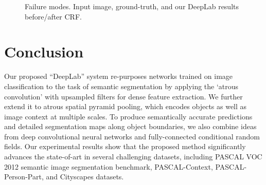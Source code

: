 \documentclass[10pt,journal,compsoc]{IEEEtran}
\begin{document}
\begin{figure}[!t]
\centering
{}
  \caption{Failure modes. Input image, ground-truth, and our DeepLab results before/after CRF.}  
  \label{fig:failure_modes}
\end{figure}
 \section{Conclusion}
Our proposed ``DeepLab'' system re-purposes networks trained
on image classification to the task of semantic segmentation by applying the `atrous convolution' with upsampled filters for dense feature extraction. We further extend it to atrous spatial pyramid pooling, which encodes objects as well as image context at multiple scales. To produce semantically accurate predictions and detailed segmentation maps along object boundaries, we also combine ideas from deep convolutional neural networks and fully-connected conditional random fields. Our experimental results show that the
proposed method significantly advances the state-of-art in several challenging
datasets, including PASCAL VOC 2012 semantic image segmentation benchmark, PASCAL-Context, PASCAL-Person-Part, and Cityscapes datasets.
\end{document}
